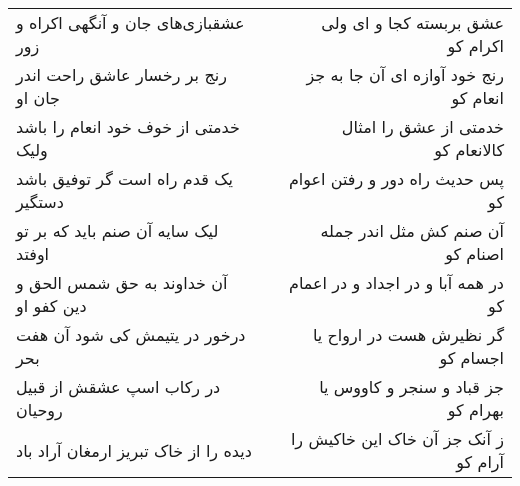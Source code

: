 \begin{center}
\begin{longtable}{l p{0.5cm} r}
\\
عشقبازی‌های جان و آنگهی اکراه و زور
&&
عشق بربسته کجا و ای ولی اکرام کو
\\
رنج بر رخسار عاشق راحت اندر جان او
&&
رنج خود آوازه ای آن جا به جز انعام کو
\\
خدمتی از خوف خود انعام را باشد ولیک
&&
خدمتی از عشق را امثال کالانعام کو
\\
یک قدم راه است گر توفیق باشد دستگیر
&&
پس حدیث راه دور و رفتن اعوام کو
\\
لیک سایه آن صنم باید که بر تو اوفتد
&&
آن صنم کش مثل اندر جمله اصنام کو
\\
آن خداوند به حق شمس الحق و دین کفو او
&&
در همه آبا و در اجداد و در اعمام کو
\\
درخور در یتیمش کی شود آن هفت بحر
&&
گر نظیرش هست در ارواح یا اجسام کو
\\
در رکاب اسپ عشقش از قبیل روحیان
&&
جز قباد و سنجر و کاووس یا بهرام کو
\\
دیده را از خاک تبریز ارمغان آراد باد
&&
ز آنک جز آن خاک این خاکیش را آرام کو
\\
\end{longtable}
\end{center}
